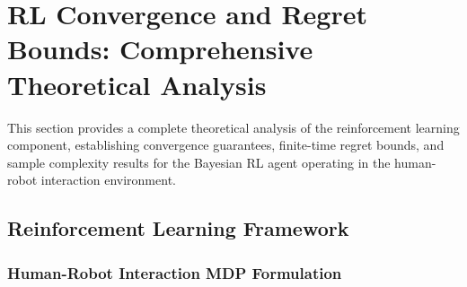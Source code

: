 \section{RL Convergence and Regret Bounds: Comprehensive Theoretical Analysis}

This section provides a complete theoretical analysis of the reinforcement learning component, establishing convergence guarantees, finite-time regret bounds, and sample complexity results for the Bayesian RL agent operating in the human-robot interaction environment.

\subsection{Reinforcement Learning Framework}

\subsubsection{Human-Robot Interaction MDP Formulation}

